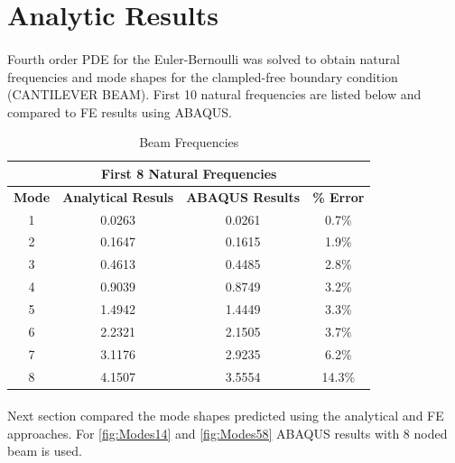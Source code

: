 \documentclass[12pt]{article}
\begin{document}
\maketitle

\section{Analytic Results}

\paragraph{}
Fourth order PDE for the Euler-Bernoulli was solved to obtain natural frequencies and mode shapes for the clampled-free boundary condition (CANTILEVER BEAM). First 10 natural frequencies are listed below and compared to FE results using ABAQUS. 

\begin{table}[H]
  \centering
  \caption{Beam Frequencies}
    \begin{tabular}{crrc}
    \toprule
    \multicolumn{4}{c}{\textbf{First 8 Natural Frequencies}} \\
    \midrule
    \textbf{Mode} & \textbf{Analytical Resuls} & \textbf{ABAQUS Results} & \textbf{\% Error} \\
    1     & \multicolumn{1}{c}{0.0263} & \multicolumn{1}{c}{0.0261} & 0.7\% \\
    2     & \multicolumn{1}{c}{0.1647} & \multicolumn{1}{c}{0.1615} & 1.9\% \\
    3     & \multicolumn{1}{c}{0.4613} & \multicolumn{1}{c}{0.4485} & 2.8\% \\
    4     & \multicolumn{1}{c}{0.9039} & \multicolumn{1}{c}{0.8749} & 3.2\% \\
    5     & \multicolumn{1}{c}{1.4942} & \multicolumn{1}{c}{1.4449} & 3.3\% \\
    6     & \multicolumn{1}{c}{2.2321} & \multicolumn{1}{c}{2.1505} & 3.7\% \\
    7     & \multicolumn{1}{c}{3.1176} & \multicolumn{1}{c}{2.9235} & 6.2\% \\
    8     & \multicolumn{1}{c}{4.1507} & \multicolumn{1}{c}{3.5554} & 14.3\% \\
    \bottomrule
    \end{tabular}%
  \label{tab:addlabel}%
\end{table}%

\paragraph{}
Next section compared the mode shapes predicted using the analytical and FE approaches. For \ref{fig:Modes14} and \ref{fig:Modes58} ABAQUS results with 8 noded beam is used.
\end{document}
